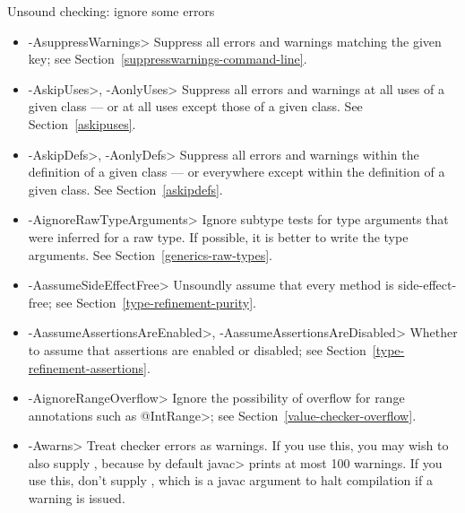 Unsound checking: ignore some errors
\begin{itemize}
\item \<-AsuppressWarnings>
  Suppress all errors and warnings matching the given key; see
  Section~\ref{suppresswarnings-command-line}.
\item \<-AskipUses>, \<-AonlyUses>
  Suppress all errors and warnings at all uses of a given class --- or at all
  uses except those of a given class.  See Section~\ref{askipuses}.
\item \<-AskipDefs>, \<-AonlyDefs>
  Suppress all errors and warnings within the definition of a given class
  --- or everywhere except within the definition of a given class.  See
  Section~\ref{askipdefs}.
\item \<-AignoreRawTypeArguments>
  Ignore subtype tests for type arguments that were inferred for a raw
  type.  If possible, it is better to write the type arguments.  See
  Section~\ref{generics-raw-types}.
\item \<-AassumeSideEffectFree>
  Unsoundly assume that every method is side-effect-free; see
  Section~\ref{type-refinement-purity}.
\item \<-AassumeAssertionsAreEnabled>, \<-AassumeAssertionsAreDisabled>
  Whether to assume that assertions are enabled or disabled; see Section~\ref{type-refinement-assertions}.
\item \<-AignoreRangeOverflow>
  Ignore the possibility of overflow for range annotations such as
  \<@IntRange>; see Section~\ref{value-checker-overflow}.
\item \<-Awarns>
  Treat checker errors as warnings.  If you use this, you may wish to also
  supply , because by default \<javac> prints at
  most 100 warnings.  If you use this, don't supply ,
  which is a javac argument to halt compilation if a warning is issued.
\end{itemize}


